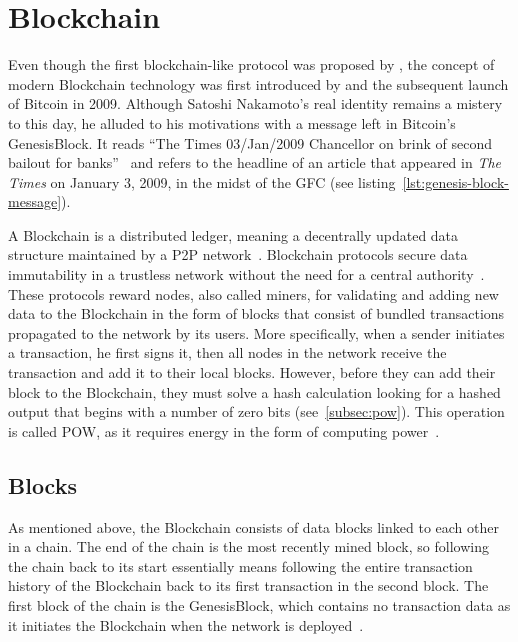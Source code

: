 \section{Blockchain}\label{sec:blockchain}

Even though the first blockchain-like protocol was proposed by \textcite{chaum_computer_1982}, the concept of modern \gls{Blockchain} technology was first introduced by \textcite{nakamoto_bitcoin_2008} and the subsequent launch of Bitcoin in 2009.
Although Satoshi Nakamoto's real identity remains a mistery to this day, he alluded to his motivations with a message left in Bitcoin's \gls{GenesisBlock}.
It reads \enquote{The Times 03/Jan/2009 Chancellor on brink of second bailout for banks}~\autocite{nakamoto_bitcoin_2009} and refers to the headline of an article that appeared in \emph{The Times} on January 3, 2009, in the midst of the \gls{GFC} (see listing~\ref{lst:genesis-block-message}).


A \gls{Blockchain} is a distributed ledger, meaning a decentrally updated data structure maintained by a \gls{P2P} network~\autocites[3]{crosby_blockchain_2015}[1]{nakamoto_bitcoin_2008}.
\Gls{Blockchain} protocols secure data immutability in a trustless network without the need for a central authority~\autocites[3]{crosby_blockchain_2015}[4]{jafar_blockchain_2021}.
These protocols reward nodes, also called miners, for validating and adding new data to the \gls{Blockchain} in the form of blocks that consist of bundled transactions propagated to the network by its users.
More specifically, when a sender initiates a transaction, he first signs it, then all nodes in the network receive the transaction and add it to their local blocks.
However, before they can add their block to the \gls{Blockchain}, they must solve a hash calculation looking for a hashed output that begins with a number of zero bits (see~\cref{subsec:pow}).
This operation is called \gls{POW}, as it requires energy in the form of computing power~\autocite[3]{nakamoto_bitcoin_2008}.

\subsection{Blocks}\label{subsec:blocks}

As mentioned above, the \gls{Blockchain} consists of data blocks linked to each other in a chain.
The end of the chain is the most recently mined block, so following the chain back to its start essentially means following the entire transaction history of the \gls{Blockchain} back to its first transaction in the second block.
The first block of the chain is the \gls{GenesisBlock}, which contains no transaction data as it initiates the \gls{Blockchain} when the network is deployed~\autocites[162]{antonopoulos_mastering_2017}[31]{antonopoulos_mastering_2019}.

